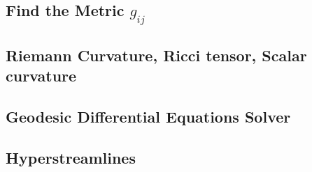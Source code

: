 \documentclass[main.tex]{subfiles}
\begin{document}
\subsection{Find the Metric $g_{ij}$}
\label{appendix:find_metric}
\lstset{style=Python}


\subsection{Riemann Curvature, Ricci tensor, Scalar curvature}
\label{appendix:Riemann}
\lstset{style=Python}

			
\subsection{Geodesic Differential Equations Solver}
\label{appendix:geo_solver}
\lstset{style=Python}


\subsection{Hyperstreamlines}
\label{appendix:hyperstreamlines}
\lstset{style=Python}

\end{document}

